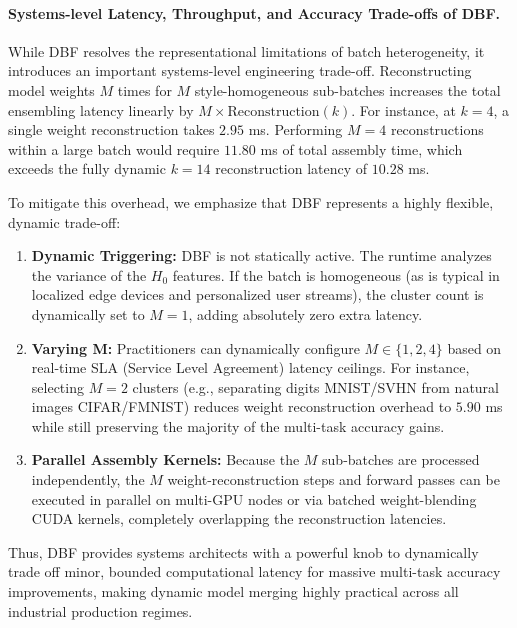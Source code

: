 \paragraph{Systems-level Latency, Throughput, and Accuracy Trade-offs of DBF.}
While DBF resolves the representational limitations of batch heterogeneity, it introduces an important systems-level engineering trade-off. Reconstructing model weights $M$ times for $M$ style-homogeneous sub-batches increases the total ensembling latency linearly by $M \times \text{Reconstruction}(k)$. For instance, at $k=4$, a single weight reconstruction takes $2.95$ ms. Performing $M=4$ reconstructions within a large batch would require $11.80$ ms of total assembly time, which exceeds the fully dynamic $k=14$ reconstruction latency of $10.28$ ms.

To mitigate this overhead, we emphasize that DBF represents a highly flexible, dynamic trade-off:
\begin{enumerate}
    \item \textbf{Dynamic Triggering:} DBF is not statically active. The runtime analyzes the variance of the $H_0$ features. If the batch is homogeneous (as is typical in localized edge devices and personalized user streams), the cluster count is dynamically set to $M=1$, adding absolutely zero extra latency.
    \item \textbf{Varying M:} Practitioners can dynamically configure $M \in \{1, 2, 4\}$ based on real-time SLA (Service Level Agreement) latency ceilings. For instance, selecting $M=2$ clusters (e.g., separating digits MNIST/SVHN from natural images CIFAR/FMNIST) reduces weight reconstruction overhead to $5.90$ ms while still preserving the majority of the multi-task accuracy gains.
    \item \textbf{Parallel Assembly Kernels:} Because the $M$ sub-batches are processed independently, the $M$ weight-reconstruction steps and forward passes can be executed in parallel on multi-GPU nodes or via batched weight-blending CUDA kernels, completely overlapping the reconstruction latencies.
\end{enumerate}
Thus, DBF provides systems architects with a powerful knob to dynamically trade off minor, bounded computational latency for massive multi-task accuracy improvements, making dynamic model merging highly practical across all industrial production regimes.
